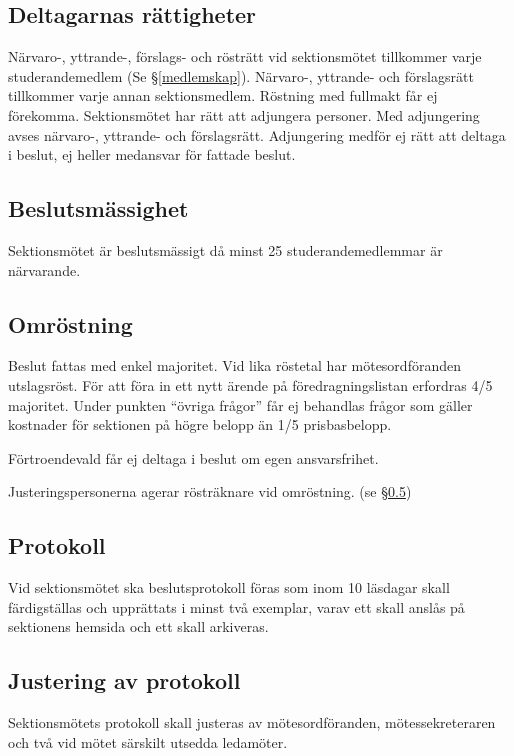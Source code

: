 \documentclass{datateknologsektionen-document}
\begin{document}
    \subsection{Deltagarnas rättigheter}
      Närvaro-, yttrande-, förslags- och rösträtt vid sektionsmötet tillkommer varje
      studerandemedlem (Se \S \ref{medlemskap}). Närvaro-, yttrande- och förslagsrätt tillkommer varje annan
      sektionsmedlem. Röstning med fullmakt får ej förekomma. Sektionsmötet har rätt att
      adjungera personer. Med adjungering avses närvaro-, yttrande- och förslagsrätt.
      Adjungering medför ej rätt att deltaga i beslut, ej heller medansvar för fattade beslut.
    \subsection{Beslutsmässighet}
      Sektionsmötet är beslutsmässigt då minst 25 studerandemedlemmar är närvarande.
    \subsection{Omröstning}
      Beslut fattas med enkel majoritet. Vid lika röstetal har mötesordföranden utslagsröst.
      För att föra in ett nytt ärende på föredragningslistan erfordras 4/5 majoritet. Under
      punkten ``övriga frågor'' får ej behandlas frågor som gäller kostnader för sektionen på
      högre belopp än 1/5 prisbasbelopp.

      Förtroendevald får ej deltaga i beslut om egen ansvarsfrihet.

      Justeringspersonerna agerar rösträknare vid omröstning. (se \S \ref{justeringavprotokoll})
    \subsection{Protokoll}
      Vid sektionsmötet ska beslutsprotokoll föras som inom 10 läsdagar skall färdigställas
      och upprättats i minst två exemplar, varav ett skall anslås på sektionens hemsida och ett
      skall arkiveras.
    \subsection{Justering av protokoll}
      \label{justeringavprotokoll}
      Sektionsmötets protokoll skall justeras av mötesordföranden, mötessekreteraren och två
      vid mötet särskilt utsedda ledamöter.
\end{document}
